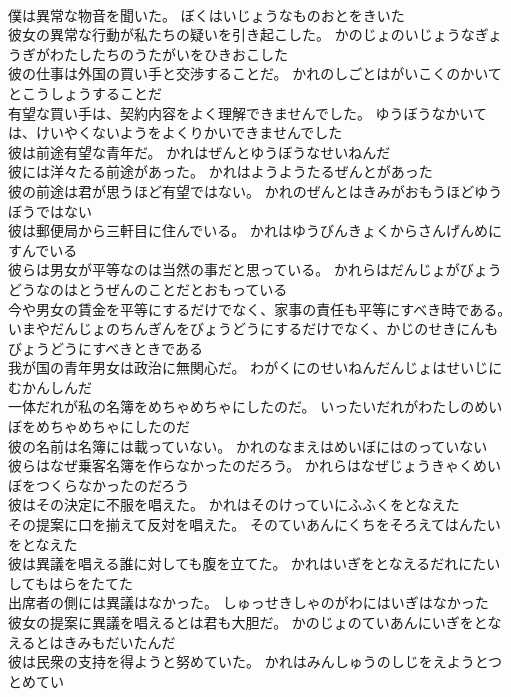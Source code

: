 \documentclass[8pt]{extreport}
\begin{document}
\begin{CJK}{UTF8}{min}
\\	僕は異常な物音を聞いた。	ぼくはいじょうなものおとをきいた 
\\	彼女の異常な行動が私たちの疑いを引き起こした。	かのじょのいじょうなぎょうぎがわたしたちのうたがいをひきおこした 
\\	彼の仕事は外国の買い手と交渉することだ。	かれのしごとはがいこくのかいてとこうしょうすることだ 
\\	有望な買い手は、契約内容をよく理解できませんでした。	ゆうぼうなかいては、けいやくないようをよくりかいできませんでした 
\\	彼は前途有望な青年だ。	かれはぜんとゆうぼうなせいねんだ 
\\	彼には洋々たる前途があった。	かれはようようたるぜんとがあった 
\\	彼の前途は君が思うほど有望ではない。	かれのぜんとはきみがおもうほどゆうぼうではない 
\\	彼は郵便局から三軒目に住んでいる。	かれはゆうびんきょくからさんげんめにすんでいる 
\\	彼らは男女が平等なのは当然の事だと思っている。	かれらはだんじょがびょうどうなのはとうぜんのことだとおもっている 
\\	今や男女の賃金を平等にするだけでなく、家事の責任も平等にすべき時である。	いまやだんじょのちんぎんをびょうどうにするだけでなく、かじのせきにんもびょうどうにすべきときである 
\\	我が国の青年男女は政治に無関心だ。	わがくにのせいねんだんじょはせいじにむかんしんだ 
\\	一体だれが私の名簿をめちゃめちゃにしたのだ。	いったいだれがわたしのめいぼをめちゃめちゃにしたのだ 
\\	彼の名前は名簿には載っていない。	かれのなまえはめいぼにはのっていない 
\\	彼らはなぜ乗客名簿を作らなかったのだろう。	かれらはなぜじょうきゃくめいぼをつくらなかったのだろう 
\\	彼はその決定に不服を唱えた。	かれはそのけっていにふふくをとなえた 
\\	その提案に口を揃えて反対を唱えた。	そのていあんにくちをそろえてはんたいをとなえた 
\\	彼は異議を唱える誰に対しても腹を立てた。	かれはいぎをとなえるだれにたいしてもはらをたてた 
\\	出席者の側には異議はなかった。	しゅっせきしゃのがわにはいぎはなかった 
\\	彼女の提案に異議を唱えるとは君も大胆だ。	かのじょのていあんにいぎをとなえるとはきみもだいたんだ 
\\	彼は民衆の支持を得ようと努めていた。	かれはみんしゅうのしじをえようとつとめてい 

\end{CJK}
\end{document}
